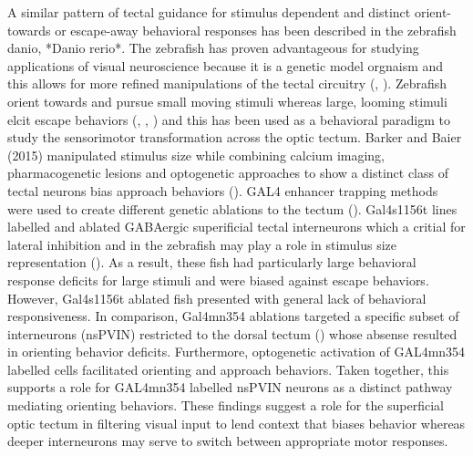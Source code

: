 \documentclass{ar-1col}
\begin{document}
{A similar pattern of tectal guidance for stimulus dependent and distinct orient-towards or escape-away behavioral responses has been described in the zebrafish danio, *Danio rerio*. The zebrafish has proven advantageous for studying applications of visual neuroscience because it is a genetic model orgnaism and this allows for more refined manipulations of the tectal circuitry (\cite{bilotta2001zebrafish}, \cite{mcarthur2020zebrafish}). Zebrafish orient towards and pursue small moving stimuli whereas large, looming stimuli elcit escape behaviors (\cite{bianco2011prey}, \cite{temizer2015visual}, \cite{dunn2016neural}) and this has been used as a behavioral paradigm to study the sensorimotor transformation across the optic tectum. Barker and Baier (2015) manipulated stimulus size while combining calcium imaging, pharmacogenetic lesions and optogenetic approaches to show a distinct class of tectal neurons bias approach behaviors (\cite{barker2015sensorimotor}). GAL4 enhancer trapping methods were used to create different genetic ablations to the tectum (\cite{scott2007targeting}). Gal4s1156t lines labelled and ablated GABAergic superificial tectal interneurons which a critial for lateral inhibition and in the zebrafish may play a role in stimulus size representation (\cite{preuss2014classification}). As a result, these fish had particularly large behavioral response deficits for large stimuli and were biased against escape behaviors. However, Gal4s1156t ablated fish presented with general lack of behavioral responsiveness. In comparison, Gal4mn354 ablations targeted a specific subset of interneurons (nsPVIN) restricted to the dorsal tectum (\cite{nevin2010focusing}) whose absense resulted in orienting behavior deficits. Furthermore, optogenetic activation of GAL4mn354 labelled cells facilitated orienting and approach behaviors. Taken together, this supports a role for GAL4mn354 labelled nsPVIN neurons as a distinct pathway mediating orienting behaviors. These findings suggest a role for the superficial optic tectum in filtering visual input to lend context that biases behavior whereas deeper interneurons may serve to switch between appropriate motor responses.  

}
\end{document}
